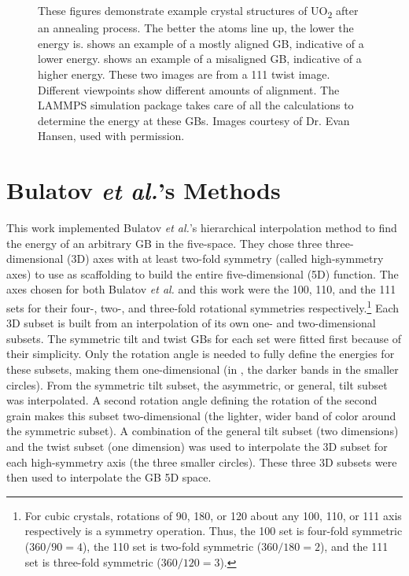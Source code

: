 \documentclass[twoside,senior]{BYUPhys}
\begin{document}
\begin{figure}[ht!]
 \caption[Example of crystal structures after annealing.]{\label{fig:lammps}These figures demonstrate example crystal structures of UO\textsubscript{2} after an annealing process.  The better the atoms line up, the lower the energy is. \protect{} shows an example of a mostly aligned GB, indicative of a lower energy.  \protect{} shows an example of a misaligned GB, indicative of a higher energy.  These two images are from a \textlangle{}111\textrangle{} twist image.  Different viewpoints show different amounts of alignment.  The LAMMPS simulation package takes care of all the calculations to determine the energy at these GBs. Images courtesy of Dr. Evan Hansen, used with permission.}
\end{figure}

\section{Bulatov \emph{et al.}'s Methods\label{methods:bulatov}}
This work implemented Bulatov \emph{et al.}'s hierarchical interpolation method to find the energy of an arbitrary GB in the five-space.\cite{bulatov2014}  They chose three three-dimensional (3D) axes with at least two-fold symmetry (called high-symmetry axes) to use as scaffolding to build the entire five-dimensional (5D) function.  The axes chosen for both Bulatov \emph{et al.} and this work were the \textlangle{}100\textrangle{}, \textlangle{}110\textrangle{}, and the \textlangle{}111\textrangle{} sets for their four-, two-, and three-fold rotational symmetries respectively.\footnote{For cubic crystals, rotations of 90\textdegree{}, 180\textdegree{}, or 120\textdegree{} about any \textlangle{}100\textrangle{}, \textlangle{}110\textrangle{}, or \textlangle{}111\textrangle{} axis respectively is a symmetry operation.\cite{stokes2007}  Thus, the \textlangle{}100\textrangle{} set is four-fold symmetric (360\textdegree{}$/90$\textdegree{}$=4$), the \textlangle{}110\textrangle{} set is two-fold symmetric (360\textdegree{}$/180$\textdegree{}$=2$), and the \textlangle{}111\textrangle{} set is three-fold symmetric (360\textdegree{}$/120$\textdegree{}$=3$).}  Each 3D subset is built from an interpolation of its own one- and two-dimensional subsets.  The symmetric tilt and twist GBs for each set were fitted first because of their simplicity.  Only the rotation angle is needed to fully define the energies for these subsets, making them one-dimensional (in , the darker bands in the smaller circles).  From the symmetric tilt subset, the asymmetric, or general, tilt subset was interpolated.  A second rotation angle defining the rotation of the second grain makes this subset two-dimensional (the lighter, wider band of color around the symmetric subset).  A combination of the general tilt subset (two dimensions) and the twist subset (one dimension) was used to interpolate the 3D subset for each high-symmetry axis (the three smaller circles).  These three 3D subsets were then used to interpolate the GB 5D space.
\end{document}
